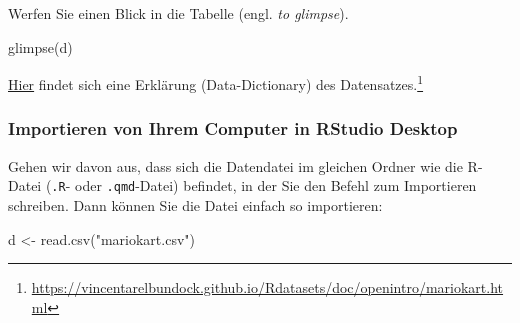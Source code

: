 \documentclass[
  letterpaper,
]{scrbook}
\newenvironment{Shaded}{\begin{snugshade}}{\end{snugshade}}
\newcommand{\FunctionTok}[1]{\textcolor[rgb]{0.28,0.35,0.67}{#1}}
\newcommand{\NormalTok}[1]{\textcolor[rgb]{0.00,0.23,0.31}{#1}}
\newcommand{\OtherTok}[1]{\textcolor[rgb]{0.00,0.23,0.31}{#1}}
\newcommand{\StringTok}[1]{\textcolor[rgb]{0.13,0.47,0.30}{#1}}
\theoremstyle{definition}
\theoremstyle{definition}
\theoremstyle{definition}
\theoremstyle{remark}
\begin{document}
Werfen Sie einen Blick in die Tabelle (engl. \emph{to glimpse}).

\begin{Shaded}
\begin{Highlighting}[]
\FunctionTok{glimpse}\NormalTok{(d)}
\end{Highlighting}
\end{Shaded}

\href{https://vincentarelbundock.github.io/Rdatasets/doc/openintro/mariokart.html}{Hier}
findet sich eine Erklärung (Data-Dictionary) des Datensatzes.\footnote{\url{https://vincentarelbundock.github.io/Rdatasets/doc/openintro/mariokart.html}}

\subsubsection{Importieren von Ihrem Computer in RStudio
Desktop}\label{importieren-von-ihrem-computer-in-rstudio-desktop}

Gehen wir davon aus, dass sich die Datendatei im gleichen Ordner wie die
R-Datei (\texttt{.R}- oder \texttt{.qmd}-Datei) befindet, in der Sie den
Befehl zum Importieren schreiben. Dann können Sie die Datei einfach so
importieren:

\begin{Shaded}
\begin{Highlighting}[]
\NormalTok{d }\OtherTok{\textless{}{-}} \FunctionTok{read.csv}\NormalTok{(}\StringTok{"mariokart.csv"}\NormalTok{)}
\end{Highlighting}
\end{Shaded}
\end{document}
